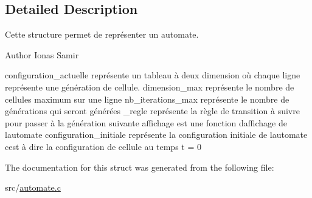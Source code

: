 \subsection{Detailed Description}
Cette structure permet de représenter un automate. 

\begin{DoxyAuthor}{Author}
Ionas Samir
\end{DoxyAuthor}
configuration\+\_\+actuelle représente un tableau à deux dimension où chaque ligne représente une génération de cellule. dimension\+\_\+max représente le nombre de cellules maximum sur une ligne nb\+\_\+iterations\+\_\+max représente le nombre de générations qui seront générées \+\_\+regle représente la règle de transition à suivre pour passer à la génération suivante affichage est une fonction d\textquotesingle{}affichage de l\textquotesingle{}automate configuration\+\_\+initiale représente la configuration initiale de l\textquotesingle{}automate c\textquotesingle{}est à dire la configuration de cellule au temps t = 0 

The documentation for this struct was generated from the following file\+:\begin{DoxyCompactItemize}
\item 
src/\hyperlink{automate_8c}{automate.\+c}\end{DoxyCompactItemize}

